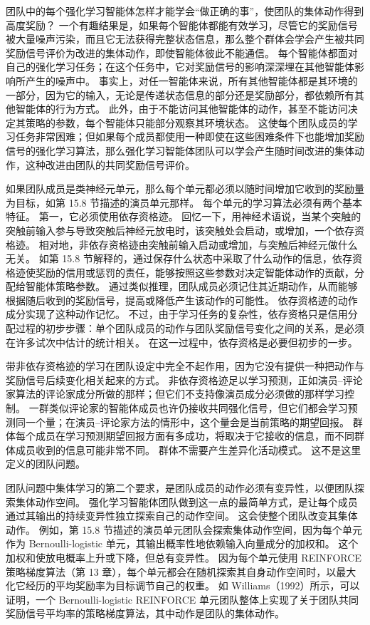 \documentclass[UTF8,12pt,a4paper,fontset=fandol]{ctexart}
\begin{document}
团队中的每个强化学习智能体怎样才能学会“做正确的事”，使团队的集体动作得到高度奖励？
一个有趣结果是，如果每个智能体都能有效学习，尽管它的奖励信号被大量噪声污染，而且它无法获得完整状态信息，那么整个群体会学会产生被共同奖励信号评价为改进的集体动作，即使智能体彼此不能通信。
每个智能体都面对自己的强化学习任务；在这个任务中，它对奖励信号的影响深深埋在其他智能体影响所产生的噪声中。
事实上，对任一智能体来说，所有其他智能体都是其环境的一部分，因为它的输入，无论是传递状态信息的部分还是奖励部分，都依赖所有其他智能体的行为方式。
此外，由于不能访问其他智能体的动作，甚至不能访问决定其策略的参数，每个智能体只能部分观察其环境状态。
这使每个团队成员的学习任务非常困难；但如果每个成员都使用一种即使在这些困难条件下也能增加奖励信号的强化学习算法，那么强化学习智能体团队可以学会产生随时间改进的集体动作，这种改进由团队的共同奖励信号评价。

如果团队成员是类神经元单元，那么每个单元都必须以随时间增加它收到的奖励量为目标，如第 15.8 节描述的演员单元那样。
每个单元的学习算法必须有两个基本特征。
第一，它必须使用依存资格迹。
回忆一下，用神经术语说，当某个突触的突触前输入参与导致突触后神经元放电时，该突触处会启动，或增加，一个依存资格迹。
相对地，非依存资格迹由突触前输入启动或增加，与突触后神经元做什么无关。
如第 15.8 节解释的，通过保存什么状态中采取了什么动作的信息，依存资格迹使奖励的信用或惩罚的责任，能够按照这些参数对决定智能体动作的贡献，分配给智能体策略参数。
通过类似推理，团队成员必须记住其近期动作，从而能够根据随后收到的奖励信号，提高或降低产生该动作的可能性。
依存资格迹的动作成分实现了这种动作记忆。
不过，由于学习任务的复杂性，依存资格只是信用分配过程的初步步骤：单个团队成员的动作与团队奖励信号变化之间的关系，是必须在许多试次中估计的统计相关。
在这一过程中，依存资格是必要但初步的一步。

带非依存资格迹的学习在团队设定中完全不起作用，因为它没有提供一种把动作与奖励信号后续变化相关起来的方式。
非依存资格迹足以学习预测，正如演员--评论家算法的评论家成分所做的那样；但它们不支持像演员成分必须做的那样学习控制。
一群类似评论家的智能体成员也许仍接收共同强化信号，但它们都会学习预测同一个量；在演员--评论家方法的情形中，这个量会是当前策略的期望回报。
群体每个成员在学习预测期望回报方面有多成功，将取决于它接收的信息，而不同群体成员收到的信息可能非常不同。
群体不需要产生差异化活动模式。
这不是这里定义的团队问题。

团队问题中集体学习的第二个要求，是团队成员的动作必须有变异性，以便团队探索集体动作空间。
强化学习智能体团队做到这一点的最简单方式，是让每个成员通过其输出的持续变异性独立探索自己的动作空间。
这会使整个团队改变其集体动作。
例如，第 15.8 节描述的演员单元团队会探索集体动作空间，因为每个单元作为 Bernoulli-logistic 单元，其输出概率性地依赖输入向量成分的加权和。
这个加权和使放电概率上升或下降，但总有变异性。
因为每个单元使用 REINFORCE 策略梯度算法（第 13 章），每个单元都会在随机探索其自身动作空间时，以最大化它经历的平均奖励率为目标调节自己的权重。
如 Williams（1992）所示，可以证明，一个 Bernoulli-logistic REINFORCE 单元团队整体上实现了关于团队共同奖励信号平均率的策略梯度算法，其中动作是团队的集体动作。
\end{document}
